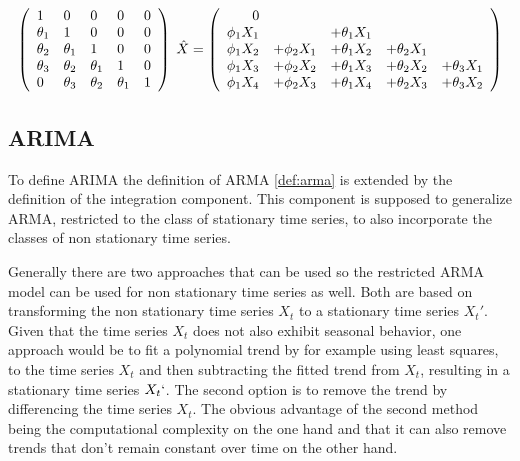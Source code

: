 \begin{equation}\label{eq:ARMA_hat_2_3_system}
    \left(\begin{array}[c]{lllll}
        1 & 0 & 0 & 0 & 0\\
        \theta_1 & 1 & 0 & 0 & 0\\
        \theta_2 & \theta_1& 1 & 0 & 0\\
        \theta_3 & \theta_2 & \theta_1& 1 & 0\\
        0 & \theta_3 & \theta_2 & \theta_1& 1
    \end{array}\right)
    \;\hat{X}=
    \left(\begin{array}[c]{rrrrr}
        0 &&&&\\ 
        \phi_1 X_1& &+\theta_1 X_{1} &&\\
        \phi_1 X_2 &+ \phi_2 X_1&+ \theta_1 X_{2} &+ \theta_2 X_{1} &\\
        \phi_1 X_3 &+ \phi_2 X_2&+ \theta_1 X_{3} &+ \theta_2 X_{2} &+ \theta_3 X_{1} \\
        \phi_1 X_4 &+ \phi_2 X_3&+ \theta_1 X_{4} &+ \theta_2 X_{3} &+ \theta_3 X_{2} 
    \end{array}\right)
\end{equation}

\subsection*{\acl{ARIMA}}

To define \acs{ARIMA} the definition of \acs{ARMA} \eqref{def:arma} is extended by the definition of the integration component. This component is supposed to generalize \acs{ARMA}, restricted to the class of stationary time series, to also incorporate the classes of non stationary time series. 

Generally there are two approaches that can be used so the restricted \acs{ARMA} model can be used for non stationary time series as well. Both are based on transforming the non stationary time series $X_t$ to a stationary time series $X_t'$. Given that the time series $X_t$ does not also exhibit seasonal behavior, one approach would be to fit a polynomial trend by for example using least squares, to the time series $X_t$ and then subtracting the fitted trend from $X_t$, resulting in a stationary time series $X_t`$. The second option is to remove the trend by differencing the time series $X_t$. The obvious advantage of the second method being the computational complexity on the one hand and that it can also remove trends that don't remain constant over time on the other hand. \textsuperscript{\cite[p.~25]{Brockwell2002Introduction2nd}}

